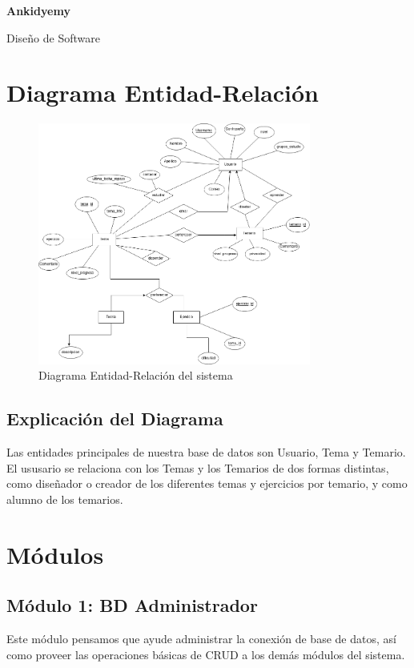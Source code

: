 \documentclass{report}
\begin{document}
\begin{titlepage}
    \centering
    \vfill
    {\Huge\bfseries Ankidyemy}\par
    \vspace{1cm}
    {\LARGE Diseño de Software}\par
    \vfill
\end{titlepage}

\chapter{Diagrama Entidad-Relación}
\begin{figure}[H]
    \centering
    \includegraphics[width=0.8\textwidth]{./Diagramas/Diagrama-ER.png}
    \caption{Diagrama Entidad-Relación del sistema}
    \label{fig:er}
\end{figure}

\section{Explicación del Diagrama}
Las entidades principales de nuestra base de datos son Usuario, Tema y Temario. El ususario se relaciona con los Temas y los Temarios de dos formas distintas, como diseñador o creador de los diferentes temas y ejercicios por temario, y como alumno de los temarios.

\chapter{Módulos}

\section{Módulo 1: BD Administrador}
Este módulo pensamos que ayude administrar la conexión de base de datos, así como proveer las operaciones básicas de CRUD a los demás módulos del sistema.
\end{document}
